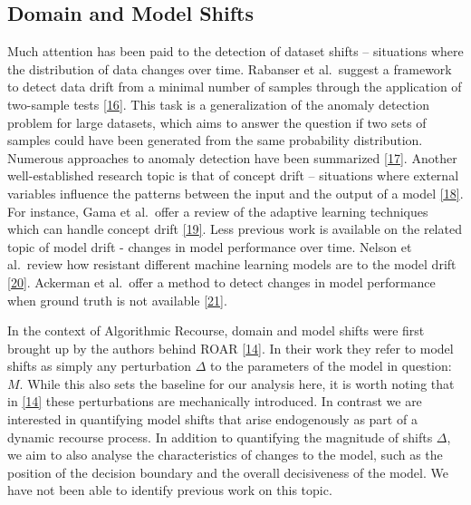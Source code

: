 \documentclass[conference,final,]{IEEEtran}
\theoremstyle{definition}
\theoremstyle{definition}
\theoremstyle{definition}
\theoremstyle{definition}
\theoremstyle{remark}
\begin{document}
\hypertarget{related-shifts}{%
\subsection{Domain and Model Shifts}\label{related-shifts}}

Much attention has been paid to the detection of dataset shifts -- situations where the distribution of data changes over time. Rabanser et al.~suggest a framework to detect data drift from a minimal number of samples through the application of two-sample tests \protect\hyperlink{ref-rabanser2019failing}{{[}16{]}}. This task is a generalization of the anomaly detection problem for large datasets, which aims to answer the question if two sets of samples could have been generated from the same probability distribution. Numerous approaches to anomaly detection have been summarized \protect\hyperlink{ref-chandola2009anomaly}{{[}17{]}}. Another well-established research topic is that of concept drift -- situations where external variables influence the patterns between the input and the output of a model \protect\hyperlink{ref-widmer1996learning}{{[}18{]}}. For instance, Gama et al.~offer a review of the adaptive learning techniques which can handle concept drift \protect\hyperlink{ref-gama2014survey}{{[}19{]}}. Less previous work is available on the related topic of model drift - changes in model performance over time. Nelson et al.~review how resistant different machine learning models are to the model drift \protect\hyperlink{ref-nelson2015evaluating}{{[}20{]}}. Ackerman et al.~offer a method to detect changes in model performance when ground truth is not available \protect\hyperlink{ref-ackerman2021machine}{{[}21{]}}.

In the context of Algorithmic Recourse, domain and model shifts were first brought up by the authors behind ROAR \protect\hyperlink{ref-upadhyay2021towards}{{[}14{]}}. In their work they refer to model shifts as simply any perturbation \(\Delta\) to the parameters of the model in question: \(M\). While this also sets the baseline for our analysis here, it is worth noting that in \protect\hyperlink{ref-upadhyay2021towards}{{[}14{]}} these perturbations are mechanically introduced. In contrast we are interested in quantifying model shifts that arise endogenously as part of a dynamic recourse process. In addition to quantifying the magnitude of shifts \(\Delta\), we aim to also analyse the characteristics of changes to the model, such as the position of the decision boundary and the overall decisiveness of the model. We have not been able to identify previous work on this topic.
\end{document}
